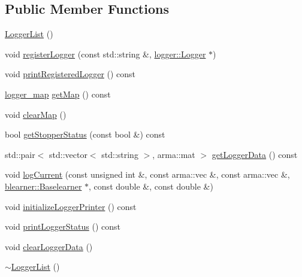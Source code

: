 \subsection*{Public Member Functions}
\begin{DoxyCompactItemize}
\item 
\mbox{\hyperlink{classloggerlist_1_1_logger_list_a67a480c6b56e3e7d79736d4ccef28f63}{Logger\+List}} ()
\item 
void \mbox{\hyperlink{classloggerlist_1_1_logger_list_a883c2526c3e56e572df670f64b966d41}{register\+Logger}} (const std\+::string \&, \mbox{\hyperlink{classlogger_1_1_logger}{logger\+::\+Logger}} $\ast$)
\item 
void \mbox{\hyperlink{classloggerlist_1_1_logger_list_a28cd5371bbd9e31f0cf041d6e73d156c}{print\+Registered\+Logger}} () const
\item 
\mbox{\hyperlink{loggerlist_8h_afa233b5ec9ffbe76605d913e86d40fe6}{logger\+\_\+map}} \mbox{\hyperlink{classloggerlist_1_1_logger_list_a285a608bfb974314cf91e7a0137aa90f}{get\+Map}} () const
\item 
void \mbox{\hyperlink{classloggerlist_1_1_logger_list_affa073a05cdd9391f871f09d5f07ea11}{clear\+Map}} ()
\item 
bool \mbox{\hyperlink{classloggerlist_1_1_logger_list_ad11e128af600ad8e68df3c702ef11792}{get\+Stopper\+Status}} (const bool \&) const
\item 
std\+::pair$<$ std\+::vector$<$ std\+::string $>$, arma\+::mat $>$ \mbox{\hyperlink{classloggerlist_1_1_logger_list_a3e70bffb8e2e69c67491408337b9274f}{get\+Logger\+Data}} () const
\item 
void \mbox{\hyperlink{classloggerlist_1_1_logger_list_a5fc042fd489ebd88c09c469763ee9faa}{log\+Current}} (const unsigned int \&, const arma\+::vec \&, const arma\+::vec \&, \mbox{\hyperlink{classblearner_1_1_baselearner}{blearner\+::\+Baselearner}} $\ast$, const double \&, const double \&)
\item 
void \mbox{\hyperlink{classloggerlist_1_1_logger_list_a07c6748f551b89aa0b1eede48b120728}{initialize\+Logger\+Printer}} () const
\item 
void \mbox{\hyperlink{classloggerlist_1_1_logger_list_a5ec429c3927009e3d87544a0f084e678}{print\+Logger\+Status}} () const
\item 
void \mbox{\hyperlink{classloggerlist_1_1_logger_list_ae06158472ad7637b8b5722f67a7c6416}{clear\+Logger\+Data}} ()
\item 
\mbox{\hyperlink{classloggerlist_1_1_logger_list_ad63990acf805bf149c3b006790f446c6}{$\sim$\+Logger\+List}} ()
\end{DoxyCompactItemize}
